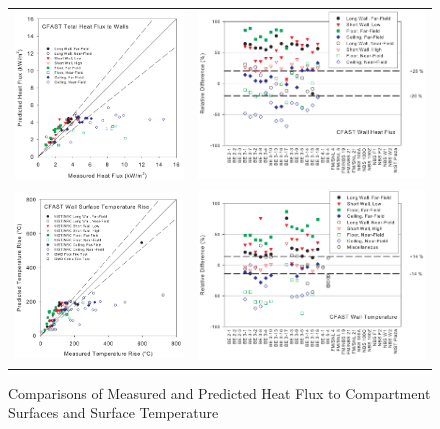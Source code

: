 \begin{figure}[p]
\begin{center}
\begin{tabular}{lr}
\includegraphics[width=2.6in]{FIGURES/ScatterPlots/Wall_Total} & \includegraphics[width=3.5in]{FIGURES/Relative_Diff/Wall_Total} \\
\includegraphics[width=2.6in]{FIGURES/ScatterPlots/Wall_Temps} & \includegraphics[width=3.5in]{FIGURES/Relative_Diff/Wall_Temps}
\end{tabular}
\end{center}
\caption{Comparisons of Measured and Predicted Heat Flux to Compartment Surfaces and Surface Temperature} \label{fig:Surface_Scatter}
\end{figure}

